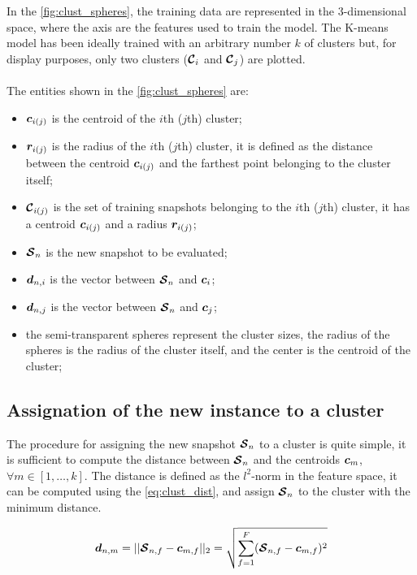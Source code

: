 In the \autoref{fig:clust_spheres}, the training data are represented in the $3$-dimensional space, where the axis are the features used to train the model. The K-means model has been ideally trained with an arbitrary number $k$ of clusters but, for display purposes, only two clusters  ($\bm{\mathcal{C}}_i$ and $\bm{\mathcal{C}}_j$) are plotted.
\paragraph*{}
The entities shown in the \autoref{fig:clust_spheres} are:
\begin{itemize}
  \item $\bm{c}_{i(j)}$ is the centroid of the $i$th ($j$th) cluster;
  \item $\bm{r}_{i(j)}$ is the radius of the $i$th ($j$th) cluster, it is defined as the distance between the centroid $\bm{c}_{i(j)}$ and the farthest point belonging to the cluster itself;
  \item $\bm{\mathcal{C}}_{i(j)}$ is the set of training snapshots belonging to the $i$th ($j$th) cluster, it has a centroid $\bm{c}_{i(j)}$ and a radius $\bm{r}_{i(j)}$;
  \item $\bm{\mathcal{S}}_n$ is the new snapshot to be evaluated;
  \item $\bm{d}_{n,i}$ is the vector between $\bm{\mathcal{S}}_n$ and $\bm{c}_i$;
  \item $\bm{d}_{n,j}$ is the vector between $\bm{\mathcal{S}}_n$ and $\bm{c}_j$;
  \item the semi-transparent spheres represent the cluster sizes, the radius of the spheres is the radius of the cluster itself, and the center is the centroid of the cluster;
\end{itemize}

\subsection{Assignation of the new instance to a cluster}
The procedure for assigning the new snapshot $\bm{\mathcal{S}}_n$ to a cluster is quite simple, it is sufficient to compute the distance between $\bm{\mathcal{S}}_n$ and the centroids $\bm{c}_m$, $\forall m \in  [1, \dots , k]$. The distance is defined as the $l^2$-norm in the feature space, it can be computed using the \autoref{eq:clust_dist}, and assign $\bm{\mathcal{S}}_n$ to the cluster with the minimum distance.

\begin{equation}
  \label{eq:clust_dist}
  \bm{d}_{n,m} = ||\bm{\mathcal{S}}_{n,f} - \bm{c}_{m,f}||_2 = \sqrt{\sum_{f=1}^{F} (\bm{\mathcal{S}}_{n,f} - \bm{c}_{m,f})^2}
\end{equation}

